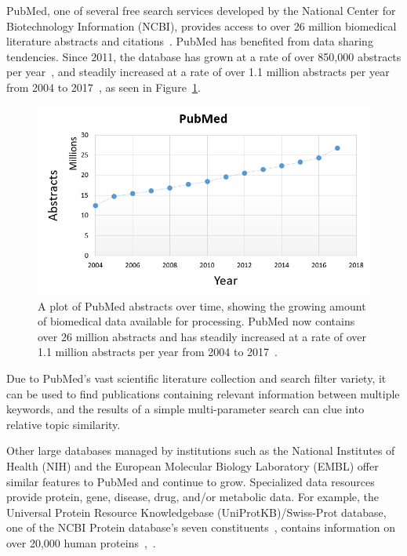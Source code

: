 \documentclass{IEEEtran}
\begin{document}
		PubMed, one of several free search services developed by the National Center for Biotechnology Information (NCBI), provides access to over 26 million biomedical literature abstracts and citations~\cite{pubmed}. PubMed has benefited from data sharing tendencies.  Since 2011, the database has grown at a rate of over 850,000 abstracts per year~\cite{andronis}, and steadily increased at a rate of over 1.1 million abstracts per year from 2004 to 2017~\cite{pubmedstats}, as seen in Figure~\ref{pubmed}.
		\begin{figure}[h]
			\centering
			\includegraphics[width=\linewidth]{pubmed}
			\caption{\footnotesize A plot of PubMed abstracts over time, showing the growing amount of biomedical data available for processing. PubMed now contains over 26 million abstracts and has steadily increased at a rate of over 1.1 million abstracts per year from 2004 to 2017~\cite{pubmedstats}.}
			\label{pubmed}
		\end{figure}
		
		Due to PubMed's vast scientific literature collection and search filter variety, it can be used to find publications containing relevant information between multiple keywords, and the results of a simple multi-parameter search can clue into relative topic similarity.
		
		Other large databases managed by institutions such as the National Institutes of Health (NIH) and the European Molecular Biology Laboratory (EMBL) offer similar features to PubMed and continue to grow.  Specialized data resources provide protein, gene, disease, drug, and/or metabolic data.  For example, the Universal Protein Resource Knowledgebase (UniProtKB)/Swiss-Prot database, one of the NCBI Protein database's seven constituents~\cite{oxford}, contains information on over 20,000 human proteins~\cite{uniprot},~\cite{RN54}.  
		
\end{document}
